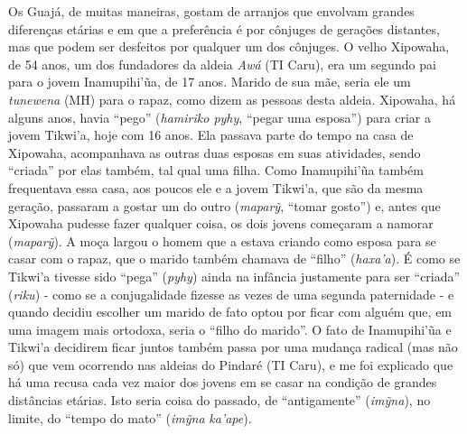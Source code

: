 Os Guajá, de muitas maneiras, gostam de arranjos que envolvam grandes
diferenças etárias e em que a preferência é por cônjuges de gerações
distantes, mas que podem ser desfeitos por qualquer um dos cônjuges. O
velho Xipowaha, de 54 anos, um dos fundadores da aldeia \emph{Awá} (TI
Caru), era um segundo pai para o jovem Inamupihi'ũa, de 17 anos. Marido
de sua mãe, seria ele um \emph{tunewena} (MH) para o rapaz, como dizem
as pessoas desta aldeia. Xipowaha, há alguns anos, havia ``pego''
(\emph{hamiriko pyhy}, ``pegar uma esposa'') para criar a jovem Tikwi'a,
hoje com 16 anos. Ela passava parte do tempo na casa de Xipowaha,
acompanhava as outras duas esposas em suas atividades, sendo ``criada''
por elas também, tal qual uma filha. Como Inamupihi'ũa também
frequentava essa casa, aos poucos ele e a jovem Tikwi'a, que são da
mesma geração, passaram a gostar um do outro (\emph{maparỹ}, ``tomar
gosto'') e, antes que Xipowaha pudesse fazer qualquer coisa, os dois
jovens começaram a namorar (\emph{maparỹ}). A moça largou o homem que a
estava criando como esposa para se casar com o rapaz, que o marido
também chamava de ``filho'' (\emph{haxa'a}). É como se Tikwi'a tivesse
sido ``pega'' (\emph{pyhy}) ainda na infância justamente para ser ``criada''
(\emph{riku}) - como se a conjugalidade fizesse as vezes de uma segunda
paternidade - e quando decidiu escolher um marido de fato optou por
ficar com alguém que, em uma imagem mais ortodoxa, seria o ``filho do
marido''. O fato de Inamupihi'ũa e Tikwi'a decidirem ficar juntos também
passa por uma mudança radical (mas não só) que vem ocorrendo nas aldeias
do Pindaré (TI Caru), e me foi explicado que há uma recusa cada vez
maior dos jovens em se casar na condição de grandes distâncias etárias.
Isto seria coisa do passado, de ``antigamente'' (\emph{imỹna}), no
limite, do ``tempo do mato'' (\emph{imỹna} \emph{ka'ape}).

